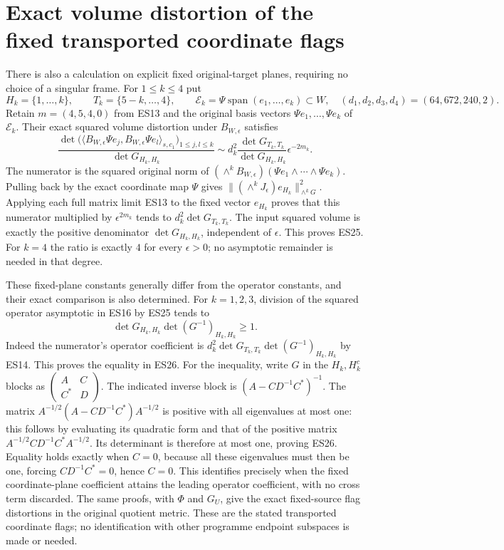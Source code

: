 \documentclass[11pt]{article}
\newcommand{\C}{\mathbb C}
\newcommand{\Span}{\operatorname{span}}
\begin{document}
\section{Exact volume distortion of the fixed transported coordinate flags}
There is also a calculation on explicit fixed original-target
planes, requiring no choice of a singular frame. For $1\le k\le4$
put
\[
 H_k=\{1,\ldots,k\},\qquad T_k=\{5-k,\ldots,4\},\qquad
 \mathcal E_k=\Psi\Span(e_1,\ldots,e_k)\subset W,
 \quad(d_1,d_2,d_3,d_4)=(64,672,240,2).
\]
Retain $m=(4,5,4,0)$ from ES13 and the original basis vectors
$\Psi e_1,\ldots,\Psi e_k$ of $\mathcal E_k$. Their exact squared
volume distortion under $B_{W,\epsilon}$ satisfies
\[
 \frac{\det\bigl(\langle B_{W,\epsilon}\Psi e_j,
                         B_{W,\epsilon}\Psi e_l\rangle_{s,c_1}
                   \bigr)_{1\le j,l\le k}}
      {\det G_{H_k,H_k}}
 \sim d_k^2\frac{\det G_{T_k,T_k}}{\det G_{H_k,H_k}}
                  \epsilon^{-2m_k}.
 \tag{ES25}
\]
The numerator is the squared original norm of
$(\wedge^k B_{W,\epsilon})(\Psi e_1\wedge\cdots\wedge\Psi e_k)$.
Pulling back by the exact coordinate map $\Psi$ gives
$\|(\wedge^kJ_\epsilon)e_{H_k}\|_{\wedge^kG}^2$.
Applying each full matrix limit ES13 to the fixed vector
$e_{H_k}$ proves that this numerator multiplied by
$\epsilon^{2m_k}$ tends to $d_k^2\det G_{T_k,T_k}$.
The input squared volume is exactly the positive denominator
$\det G_{H_k,H_k}$, independent of $\epsilon$. This proves ES25.
For $k=4$ the ratio is exactly $4$ for every $\epsilon>0$;
no asymptotic remainder is needed in that degree.

These fixed-plane constants generally differ from the operator
constants, and their exact comparison is also determined. For
$k=1,2,3$, division of the squared operator asymptotic in ES16
by ES25 tends to
\[
 \det G_{H_k,H_k}\det(G^{-1})_{H_k,H_k}\ge1.
 \tag{ES26}
\]
Indeed the numerator's operator coefficient is
$d_k^2\det G_{T_k,T_k}\det(G^{-1})_{H_k,H_k}$
by ES14. This proves the equality in ES26. For the inequality,
write $G$ in the $H_k,H_k^c$ blocks as
$\left(\begin{smallmatrix}A&C\\C^*&D\end{smallmatrix}\right)$.
The indicated inverse block is $(A-CD^{-1}C^*)^{-1}$.
The matrix $A^{-1/2}(A-CD^{-1}C^*)A^{-1/2}$ is positive with
all eigenvalues at most one: this follows by evaluating its
quadratic form and that of the positive matrix
$A^{-1/2}CD^{-1}C^*A^{-1/2}$. Its determinant is therefore at
most one, proving ES26. Equality holds exactly when $C=0$,
because all these eigenvalues must then be one, forcing
$CD^{-1}C^*=0$, hence $C=0$. This identifies precisely when
the fixed coordinate-plane coefficient attains the leading
operator coefficient, with no cross term discarded.
The same proofs, with $\Phi$ and $G_U$, give the exact fixed-source
flag distortions in the original quotient metric. These are
the stated transported coordinate flags; no identification with
other programme endpoint subspaces is made or needed.
\end{document}
